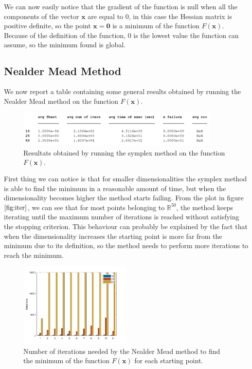 We can now easily notice that the gradient of the function is null when all the components of the vector $\mathbf{x}$ are equal to 0, in this case the Hessian matrix is positive definite, so the point $\mathbf{x} = \mathbf{0}$ is a minimum of the function $F(\mathbf{x})$. 
Because of the definition of the function, $0$ is the lowest value the function can assume, so the minimum found is global.


\medskip
\subsection*{Nealder Mead Method}
We now report a table containing some general results obtained by running the Nealder Mead method on the function $F(\mathbf{x})$.

\begin{figure}[htbp]
    \centering
    \includegraphics[width = 0.9\textwidth]{img/pb76_table_SX.png}
    \caption{Resultats obtained by running the symplex method on the function $F(\mathbf{x})$.}
\end{figure}

First thing we can notice is that for smaller dimensionalities the symplex method is able to find the minimum in a reasonable amount of time, but when the dimensionality becomes higher the method starts failing.
From the plot in figure $\eqref{fig:iter}$, we can see that for most points belonging to $\mathbb{R}^{50}$, the method keeps iterating until the maximum number of iterations is reached without satisfying the stopping criterion.
This behaviour can probably be explained by the fact that when the dimensionality increases the starting point is more far from the minimum due to its definition, so the method needs to perform more iterations to reach the minimum.
\begin{figure}[htbp]
    \centering
    \includegraphics[width = 0.5\textwidth]{img/pb76_SX_iter.png}
    \caption{Number of iterations needed by the Nealder Mead method to find the minimum of the function $F(\mathbf{x})$ for each starting point.}
    \label{fig:iter}
\end{figure}

